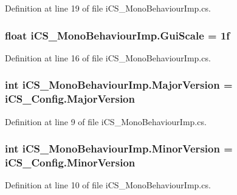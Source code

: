 Definition at line 19 of file i\+C\+S\+\_\+\+Mono\+Behaviour\+Imp.\+cs.

\hypertarget{classi_c_s___mono_behaviour_imp_a0962fd37bc8b6e6105b3caacfe72f900}{
\subsubsection[{Gui\+Scale}]{\setlength{\rightskip}{0pt plus 5cm}float i\+C\+S\+\_\+\+Mono\+Behaviour\+Imp.\+Gui\+Scale = 1f}}\label{classi_c_s___mono_behaviour_imp_a0962fd37bc8b6e6105b3caacfe72f900}


Definition at line 16 of file i\+C\+S\+\_\+\+Mono\+Behaviour\+Imp.\+cs.

\hypertarget{classi_c_s___mono_behaviour_imp_a4997378a3c0cf43e35b19b24e47fc750}{
\subsubsection[{Major\+Version}]{\setlength{\rightskip}{0pt plus 5cm}int i\+C\+S\+\_\+\+Mono\+Behaviour\+Imp.\+Major\+Version = i\+C\+S\+\_\+\+Config.\+Major\+Version}}\label{classi_c_s___mono_behaviour_imp_a4997378a3c0cf43e35b19b24e47fc750}


Definition at line 9 of file i\+C\+S\+\_\+\+Mono\+Behaviour\+Imp.\+cs.

\hypertarget{classi_c_s___mono_behaviour_imp_a6723ae76fc7610b4352bd51bd7add5a2}{
\subsubsection[{Minor\+Version}]{\setlength{\rightskip}{0pt plus 5cm}int i\+C\+S\+\_\+\+Mono\+Behaviour\+Imp.\+Minor\+Version = i\+C\+S\+\_\+\+Config.\+Minor\+Version}}\label{classi_c_s___mono_behaviour_imp_a6723ae76fc7610b4352bd51bd7add5a2}


Definition at line 10 of file i\+C\+S\+\_\+\+Mono\+Behaviour\+Imp.\+cs.

